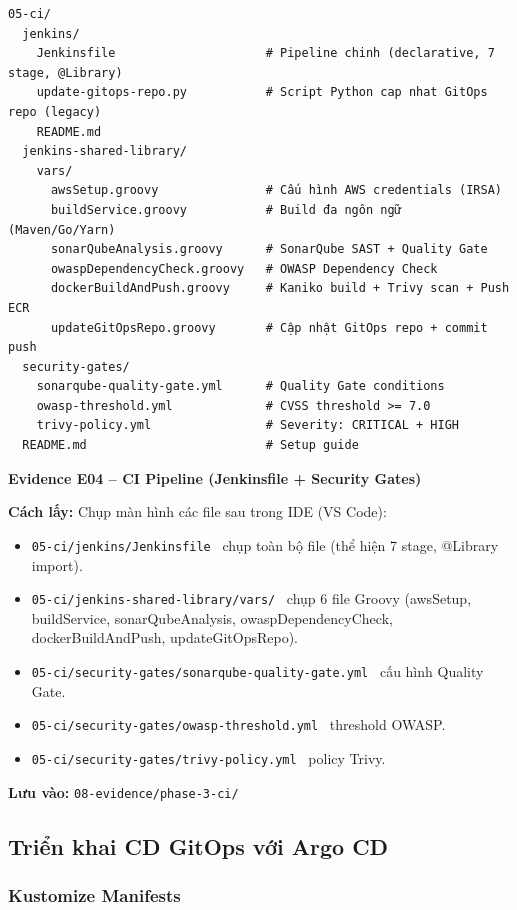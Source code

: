 \documentclass[13pt,a4paper,twoside]{extarticle}
\newcommand{\evidence}[1]{%
  \begin{evidencebox}
  #1
  \end{evidencebox}
}
\begin{document}
\begin{verbatim}
05-ci/
  jenkins/
    Jenkinsfile                     # Pipeline chinh (declarative, 7 stage, @Library)
    update-gitops-repo.py           # Script Python cap nhat GitOps repo (legacy)
    README.md
  jenkins-shared-library/
    vars/
      awsSetup.groovy               # Cấu hình AWS credentials (IRSA)
      buildService.groovy           # Build đa ngôn ngữ (Maven/Go/Yarn)
      sonarQubeAnalysis.groovy      # SonarQube SAST + Quality Gate
      owaspDependencyCheck.groovy   # OWASP Dependency Check
      dockerBuildAndPush.groovy     # Kaniko build + Trivy scan + Push ECR
      updateGitOpsRepo.groovy       # Cập nhật GitOps repo + commit push
  security-gates/
    sonarqube-quality-gate.yml      # Quality Gate conditions
    owasp-threshold.yml             # CVSS threshold >= 7.0
    trivy-policy.yml                # Severity: CRITICAL + HIGH
  README.md                         # Setup guide
\end{verbatim}

\evidence{
\textbf{Evidence E04 -- CI Pipeline (Jenkinsfile + Security Gates)}

\smallskip
\textbf{Cách lấy:} Chụp màn hình các file sau trong IDE (VS Code):
\begin{itemize}[leftmargin=*,nosep]
  \item \texttt{05-ci/jenkins/Jenkinsfile} \textrightarrow\ chụp toàn bộ file (thể hiện 7 stage, @Library import).
  \item \texttt{05-ci/jenkins-shared-library/vars/} \textrightarrow\ chụp 6 file Groovy (awsSetup, buildService, sonarQubeAnalysis, owaspDependencyCheck, dockerBuildAndPush, updateGitOpsRepo).
  \item \texttt{05-ci/security-gates/sonarqube-quality-gate.yml} \textrightarrow\ cấu hình Quality Gate.
  \item \texttt{05-ci/security-gates/owasp-threshold.yml} \textrightarrow\ threshold OWASP.
  \item \texttt{05-ci/security-gates/trivy-policy.yml} \textrightarrow\ policy Trivy.
\end{itemize}
\textbf{Lưu vào:} \texttt{08-evidence/phase-3-ci/}
}

\subsection{Triển khai CD GitOps với Argo CD}

\subsubsection{Kustomize Manifests}
\end{document}
